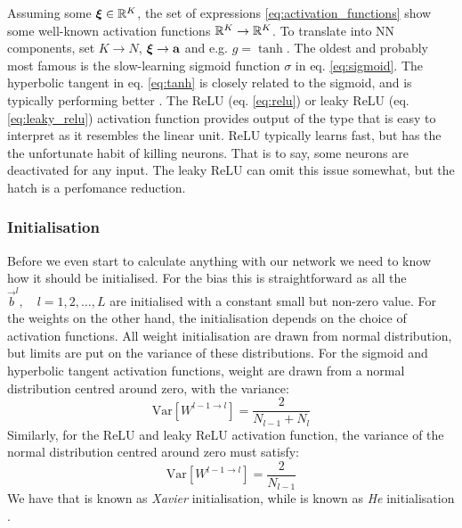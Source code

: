 
    Assuming some $\svec{\xi} \in \RR[K]$, the set of expressions \eqref{eq:activation_functions} show some well-known activation functions $\RR[K] \to \RR[K]$. To translate into NN components, set $K\to N$, $\svec{\xi} \to \vec{a}$ and e.g. $g = \tanh$. 
    The oldest and probably most famous is the slow-learning sigmoid function $\sigma$ in eq. \eqref{eq:sigmoid}. The hyperbolic tangent in eq. \eqref{eq:tanh} is closely related to the sigmoid, and is typically performing better \citep{Goodfellow2016}. The ReLU (eq. \eqref{eq:relu}) or leaky ReLU (eq. \eqref{eq:leaky_relu}) activation function provides output of the type that is easy to interpret as it resembles the linear unit. ReLU typically learns fast, but has the the unfortunate habit of killing neurons. That is to say, some neurons are deactivated for any input. The leaky ReLU can omit this issue somewhat, but the hatch is a perfomance reduction.


    \subsubsection{Initialisation}\label{sec:initialisation}
    Before we even start to calculate anything with our network we need to know how it should be initialised. For the bias this is straightforward as all the $\vec{b}^l, \quad l=1,2,\dots,L$ are initialised with a constant small but non-zero value. For the weights on the other hand, the initialisation depends on the choice of activation functions. All weight initialisation are drawn from normal distribution, but limits are put on the variance of these distributions. For the sigmoid and hyperbolic tangent activation functions, weight are drawn from a normal distribution centred around zero, with the variance:
    \begin{equation}\label{eq:init_xavier}
        \mathrm{Var}\left[W^{l-1\!\to l}\right] = \frac{2}{N_{l-1}+N_l}
    \end{equation}
    Similarly, for the ReLU and leaky ReLU activation function, the variance of the normal distribution centred around zero must satisfy:
    \begin{equation}\label{eq:init_he}
        \mathrm{Var}\left[W^{l-1\!\to l}\right] = \frac{2}{N_{l-1}}
    \end{equation}
    We have that  is known as \textit{Xavier} initialisation, while  is known as \textit{He} initialisation \citep{Goodfellow2016}.

